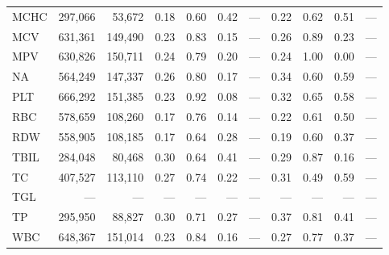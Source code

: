 \begin{table}[ht]
\begin{tabular}{lrrrrrrrrrr}
MCHC & 297,066 & 53,672 & 0.18 & 0.60 & 0.42 & --- & 0.22 & 0.62 & 0.51 & --- \\
MCV & 631,361 & 149,490 & 0.23 & 0.83 & 0.15 & --- & 0.26 & 0.89 & 0.23 & --- \\
MPV & 630,826 & 150,711 & 0.24 & 0.79 & 0.20 & --- & 0.24 & 1.00 & 0.00 & --- \\
NA & 564,249 & 147,337 & 0.26 & 0.80 & 0.17 & --- & 0.34 & 0.60 & 0.59 & --- \\
PLT & 666,292 & 151,385 & 0.23 & 0.92 & 0.08 & --- & 0.32 & 0.65 & 0.58 & --- \\
RBC & 578,659 & 108,260 & 0.17 & 0.76 & 0.14 & --- & 0.22 & 0.61 & 0.50 & --- \\
RDW & 558,905 & 108,185 & 0.17 & 0.64 & 0.28 & --- & 0.19 & 0.60 & 0.37 & --- \\
TBIL & 284,048 & 80,468 & 0.30 & 0.64 & 0.41 & --- & 0.29 & 0.87 & 0.16 & --- \\
TC & 407,527 & 113,110 & 0.27 & 0.74 & 0.22 & --- & 0.31 & 0.49 & 0.59 & --- \\
TGL & --- & --- & --- & --- & --- & --- & --- & --- & --- & --- \\
TP & 295,950 & 88,827 & 0.30 & 0.71 & 0.27 & --- & 0.37 & 0.81 & 0.41 & --- \\
WBC & 648,367 & 151,014 & 0.23 & 0.84 & 0.16 & --- & 0.27 & 0.77 & 0.37 & --- \\
\bottomrule
\end{tabular}
\label{tab:12_eval_detail_chs_mortality}
\end{table}